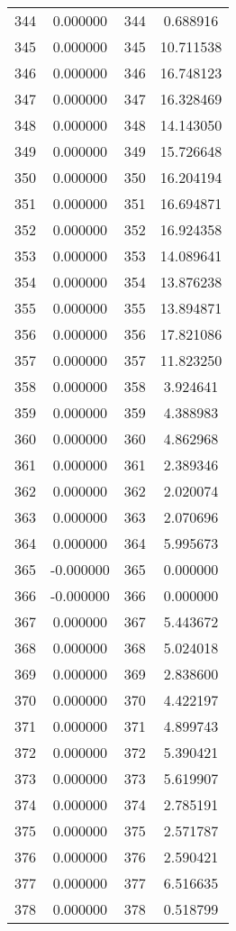 \documentclass[12pt]{article}
\begin{document}
\begin{longtable}{@{}cccc@{}}
344 & 0.000000 & 344 & 0.688916 \\
345 & 0.000000 & 345 & 10.711538 \\
346 & 0.000000 & 346 & 16.748123 \\
347 & 0.000000 & 347 & 16.328469 \\
348 & 0.000000 & 348 & 14.143050 \\
349 & 0.000000 & 349 & 15.726648 \\
350 & 0.000000 & 350 & 16.204194 \\
351 & 0.000000 & 351 & 16.694871 \\
352 & 0.000000 & 352 & 16.924358 \\
353 & 0.000000 & 353 & 14.089641 \\
354 & 0.000000 & 354 & 13.876238 \\
355 & 0.000000 & 355 & 13.894871 \\
356 & 0.000000 & 356 & 17.821086 \\
357 & 0.000000 & 357 & 11.823250 \\
358 & 0.000000 & 358 & 3.924641 \\
359 & 0.000000 & 359 & 4.388983 \\
360 & 0.000000 & 360 & 4.862968 \\
361 & 0.000000 & 361 & 2.389346 \\
362 & 0.000000 & 362 & 2.020074 \\
363 & 0.000000 & 363 & 2.070696 \\
364 & 0.000000 & 364 & 5.995673 \\
365 & -0.000000 & 365 & 0.000000 \\
366 & -0.000000 & 366 & 0.000000 \\
367 & 0.000000 & 367 & 5.443672 \\
368 & 0.000000 & 368 & 5.024018 \\
369 & 0.000000 & 369 & 2.838600 \\
370 & 0.000000 & 370 & 4.422197 \\
371 & 0.000000 & 371 & 4.899743 \\
372 & 0.000000 & 372 & 5.390421 \\
373 & 0.000000 & 373 & 5.619907 \\
374 & 0.000000 & 374 & 2.785191 \\
375 & 0.000000 & 375 & 2.571787 \\
376 & 0.000000 & 376 & 2.590421 \\
377 & 0.000000 & 377 & 6.516635 \\
378 & 0.000000 & 378 & 0.518799 \\

\end{longtable}
\end{document}
